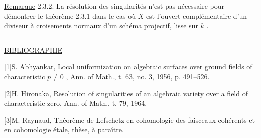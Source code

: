 
\underline{Remarque} 2.3.2.  La résolution des singularités n'est pas nécessaire pour démontrer le théorème 2.3.1 dans le cas où  $X$  est l'ouvert complémentaire d'un diviseur à croisements normaux d'un schéma projectif, lisse sur  $k$ .

\begin{center}\rule{1.5cm}{0.4pt}\end{center}

\underline{BIBLIOGRAPHIE}

[1]\quad S. Abhyankar, Local uniformization on algebraic surfaces over ground fields of characteristic  $p \neq 0$ , Ann. of Math., t. 63, no. 3, 1956, p. 491--526.

[2]\quad H. Hironaka, Resolution of singularities of an algebraic variety over a field of characteristic zero, Ann. of Math., t. 79, 1964.

[3]\quad M. Raynaud, Théorème de Lefschetz en cohomologie des faisceaux cohérents et en cohomologie étale, thèse, à paraître.

